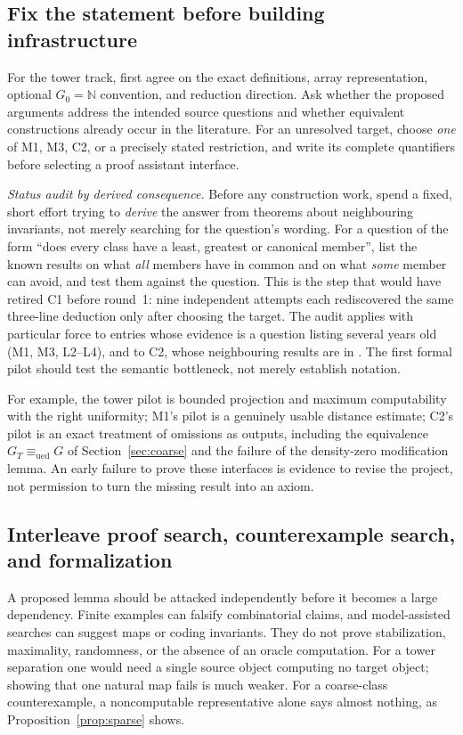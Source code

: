 \documentclass[11pt,a4paper]{article}
\newcommand{\N}{\mathbb N}
\theoremstyle{definition}\newtheorem{definition}[theorem]{Definition}
\theoremstyle{remark}\newtheorem{remark}[theorem]{Remark}
\begin{document}
\subsection{Fix the statement before building infrastructure}
For the tower track, first agree on the exact definitions, array representation, optional $G_0=\N$ convention, and reduction direction. Ask whether the proposed arguments address the intended source questions and whether equivalent constructions already occur in the literature. For an unresolved target, choose \emph{one} of M1, M3, C2, or a precisely stated restriction, and write its complete quantifiers before selecting a proof assistant interface.

\emph{Status audit by derived consequence.} Before any construction work, spend a fixed, short effort trying to \emph{derive} the answer from theorems about neighbouring invariants, not merely searching for the question's wording. For a question of the form ``does every class have a least, greatest or canonical member'', list the known results on what \emph{all} members have in common and on what \emph{some} member can avoid, and test them against the question. This is the step that would have retired C1 before round~1: nine independent attempts each rediscovered the same three-line deduction only after choosing the target. The audit applies with particular force to entries whose evidence is a question listing several years old (M1, M3, L2--L4), and to C2, whose neighbouring results are in \cite{AHJ}. The first formal pilot should test the semantic bottleneck, not merely establish notation.

For example, the tower pilot is bounded projection and maximum computability with the right uniformity; M1's pilot is a genuinely usable distance estimate; C2's pilot is an exact treatment of omissions as outputs, including the equivalence $G_T\equiv_{\mathrm{ued}}G$ of Section~\ref{sec:coarse} and the failure of the density-zero modification lemma. An early failure to prove these interfaces is evidence to revise the project, not permission to turn the missing result into an axiom.

\subsection{Interleave proof search, counterexample search, and formalization}
A proposed lemma should be attacked independently before it becomes a large dependency. Finite examples can falsify combinatorial claims, and model-assisted searches can suggest maps or coding invariants. They do not prove stabilization, maximality, randomness, or the absence of an oracle computation. For a tower separation one would need a single source object computing no target object; showing that one natural map fails is much weaker. For a coarse-class counterexample, a noncomputable representative alone says almost nothing, as Proposition~\ref{prop:sparse} shows.
\end{document}
